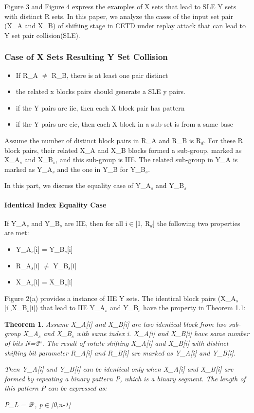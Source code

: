 \documentclass{article}
\newtheorem{theorem}{Theorem}[section]
\begin{document}
Figure 3 and Figure 4 express the examples of X sets that lead to SLE Y sets with distinct R sets. In this paper, we analyze the cases of the input set pair (X\_A and X\_B) of shifting stage in CETD under replay attack that can lead to Y set pair collision(SLE).



\subsubsection{Case of X Sets Resulting Y Set Collision}
\begin{itemize}
	\item If R\_A $\neq$ R\_B, there is at least one pair distinct
	\item the related x blocks pairs should generate a SLE y pairs.
	\item if the Y pairs are iie, then each X block pair has pattern
	\item if the Y pairs are cie, then each X block in a sub-set is from a same base
\end{itemize}
Assume the number of distinct block pairs in R\_A and R\_B is R$_d$. For these R block pairs, their related X\_A and X\_B blocks formed a sub-group, marked as X\_A$_s$ and X\_B$_s$, and this sub-group is IIE. The related sub-group in Y\_A is marked as Y\_A$_s$ and the one in Y\_B for Y\_B$_s$.

In this part, we discuss the equality case of Y\_A$_s$ and Y\_B$_s$
\paragraph{Identical Index Equality Case}
If Y\_A$_s$ and Y\_B$_s$ are IIE, then for all i$\in$[1, R$_d$] the following two properties are met:
\begin{itemize}
	\item Y\_A$_s$[i] = Y\_B$_s$[i] 
	\item R\_A$_s$[i] $\neq$ Y\_B$_s$[i]
	\item X\_A$_s$[i] = X\_B$_s$[i]
\end{itemize}
Figure 2(a) provides a instance of IIE Y sets.
The identical block pairs (X\_A$_s$[i],X\_B$_s$[i]) that lead to IIE Y\_A$_s$ and Y\_B$_s$ have the property in Theorem 1.1:
\begin{theorem}
Assume X\_A[i] and X\_B[i] are two identical block from two sub-group X\_A$_s$ and X\_B$_s$ with same index i. X\_A[i] and X\_B[i] have same number of bits N=2$^n$. The result of rotate shifting X\_A[i] and X\_B[i] with distinct shifting bit parameter R\_A[i] and R\_B[i] are marked as Y\_A[i] and Y\_B[i]. 

Then Y\_A[i] and Y\_B[i] can be identical only when X\_A[i] and X\_B[i] are formed by repeating a binary pattern P, which is a binary segment. The length of this pattern P can be expressed as:

	P\_L = 2$^p$, p$\in$[0,n-1]
\end{theorem}
\end{document}
